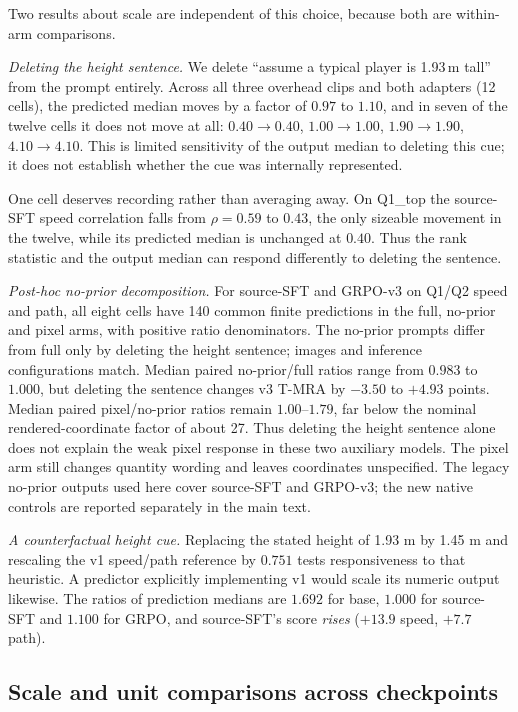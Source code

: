Two results about scale are independent of this choice, because both are
within-arm comparisons.

\emph{Deleting the height sentence.} We delete ``assume a typical player is
1.93\,m tall'' from the prompt entirely. Across all three overhead clips and
both adapters (12 cells), the predicted median moves by a factor of $0.97$ to
$1.10$, and in seven of the twelve cells it does not move at all: $0.40 \to
0.40$, $1.00 \to 1.00$, $1.90 \to 1.90$, $4.10 \to 4.10$. This is limited sensitivity of the output median to deleting this cue;
it does not establish whether the cue was internally represented.

One cell deserves recording rather than averaging away. On Q1\_top the
source-SFT speed correlation falls from $\rho = 0.59$ to $0.43$, the only
sizeable \rhosp{} movement in the twelve, while its predicted median is
unchanged at $0.40$. Thus the rank statistic and the output median can respond
differently to deleting the sentence.

\emph{Post-hoc no-prior decomposition.} For source-SFT and GRPO-v3 on
Q1/Q2 speed and path, all eight cells have 140 common finite predictions in
the full, no-prior and pixel arms, with positive ratio denominators. The
no-prior prompts differ from full only by deleting the height sentence;
images and inference configurations match. Median paired no-prior/full
ratios range from $0.983$ to $1.000$, but deleting the sentence changes v3
T-MRA by $-3.50$ to $+4.93$ points. Median paired pixel/no-prior ratios
remain $1.00$--$1.79$, far below the nominal rendered-coordinate factor
of about 27. Thus deleting the height sentence alone does not explain the
weak pixel response in these two auxiliary models. The pixel arm still
changes quantity wording and leaves coordinates unspecified. The legacy
no-prior outputs used here cover source-SFT and GRPO-v3; the new native
controls are reported separately in the main text.

\emph{A counterfactual height cue.} Replacing the stated height of 1.93 m by 1.45 m and rescaling the v1
speed/path reference by $0.751$ tests responsiveness to that heuristic.
A predictor explicitly implementing v1 would scale its numeric output likewise. The ratios of prediction medians are $1.692$ for
base, $1.000$ for source-SFT and $1.100$ for GRPO, and source-SFT's score
\emph{rises} ($+13.9$ speed, $+7.7$ path).

\subsection{Scale and unit comparisons across checkpoints}
\label{sec:scale_transfer}

